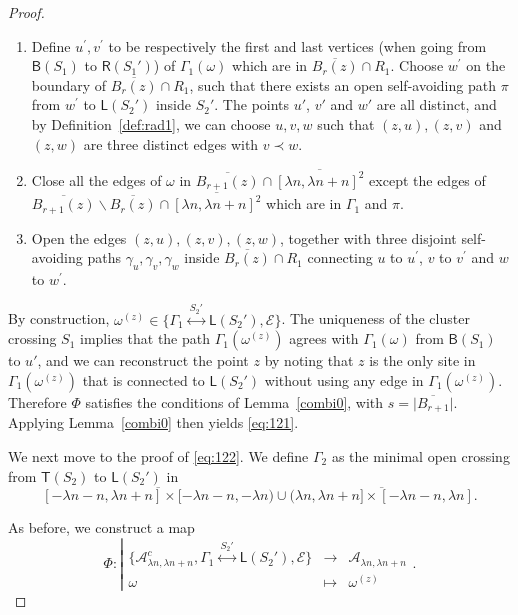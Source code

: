 \documentclass[12pt, twoside,a4paper,reqno]{amsart}
\theoremstyle{plain}
\theoremstyle{remark}
\theoremstyle{definition}
\newcommand{\lr}[1][]{\overset{\:#1\:}\longleftrightarrow}
\newcommand{\ol}{\overline}
\begin{document}
\begin{proof}
\begin{enumerate}
\item Define $u^{\prime },v^{\prime }$ to be respectively the first and last
  vertices (when going from $\mathsf B(S_1)$ to $\mathsf R(S_1')$) of
  $\Gamma_1(\omega)$ which are in $\overline{B_r\left( z\right) }\cap R_1$.
  Choose $w^{\prime }$ on the boundary of $%
  \overline{B_r\left( z\right) }\cap R_1$, such that there exists an open
  self-avoiding path $\pi$ from $w^{\prime }$ to $\mathsf L(S_2')$ inside
  $S_2'$. The points $u'$, $v'$ and $w'$ are all distinct, and by
  Definition~\ref{def:rad1}, we can choose $u,v,w$ such that $\left( z,u\right)
  ,\left( z,v\right)$ and $\left( z,w\right) $ are three distinct edges with $%
  v \prec w $.

\item Close all the edges of $\omega $ in $\overline{B_{r+1}\left( z\right)
  }\cap \ol{ [\lambda n,\lambda n+n]^2}$ except the edges of
  $\overline{B_{r+1}\left( z\right) }\backslash \overline{B_{r}\left( z\right)
  }\cap \ol{[\lambda n,\lambda n+n]^2}$ which are in $\Gamma_1$ and $\pi$.

\item Open the edges $\left( z,u\right) ,\left( z,v\right) ,\left( z,w\right) $,
  together with three disjoint self-avoiding paths $\gamma _{u},\gamma
  _{v},\gamma _{w}$ inside $\ol{B_{r}(z)}\cap R_1$ connecting $u$ to $u^{\prime }$,
  $v$ to $v^{\prime }$ and $w$ to $w^{\prime } $.
\end{enumerate}

By construction, $\omega^{(z)} \in \{\Gamma_1\lr[S_2']\mathsf L(S_2'), \mathcal
E\}$. The uniqueness of the cluster crossing $S_1$ implies that the path
$\Gamma_1(\omega^{(z)})$ agrees with $\Gamma_1(\omega)$ from $\mathsf B(S_1)$ to
$u'$, and we can reconstruct the point $z$ by noting that $z$ is the only site
in $\Gamma_1 (\omega^{(z)})$ that is connected to $\mathsf L(S_2')$  without using any edge in $\Gamma_1 (\omega^{(z)})$. Therefore $\Phi $
satisfies the conditions of Lemma~\ref{combi0}, with
$s=\vert\overline{B_{r+1}}\vert $. Applying Lemma~\ref{combi0} then yields
\eqref{eq:121}.

We next move to the proof of \eqref{eq:122}. We define $\Gamma_2$ as the minimal
open crossing from $\mathsf T(S_2)$ to $\mathsf L(S_2')$ in \[ \ol{[-\lambda n-n, \lambda n+n]\times [-\lambda n -n,-\lambda n)}
\cup\ol{(\lambda n , \lambda n+n]\times [-\lambda n-n, \lambda n]}.\]

As before, we construct a map
\begin{equation}
      \Phi:
  \left\vert  \begin{array}{ccc}
\{\mathcal A_{\lambda n,\lambda n+n}^{c}, \Gamma_1\lr[S_2']\mathsf L(S_2'),  \mathcal E\}&\to&  \mathcal A_{\lambda n,\lambda n+n}\\
    \omega&\mapsto&\omega^{(z)}
  \end{array}
  \right. .
  \end{equation}


\end{proof}
\end{document}
